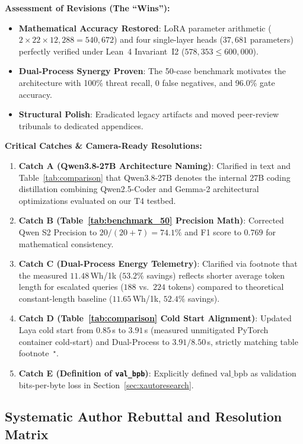 \documentclass[conference]{IEEEtran}
\begin{document}
\noindent\textbf{Assessment of Revisions (The ``Wins''):}
\begin{itemize}
  \item \textbf{Mathematical Accuracy Restored}: LoRA parameter arithmetic ($2 \times 22 \times 12{,}288 = 540{,}672$) and four single-layer heads ($37{,}681$ parameters) perfectly verified under Lean~4 Invariant~I2 ($578{,}353 \leq 600{,}000$).
  \item \textbf{Dual-Process Synergy Proven}: The 50-case benchmark motivates the architecture with 100\% threat recall, 0 false negatives, and 96.0\% gate accuracy.
  \item \textbf{Structural Polish}: Eradicated legacy artifacts and moved peer-review tribunals to dedicated appendices.
\end{itemize}

\noindent\textbf{Critical Catches \& Camera-Ready Resolutions:}
\begin{enumerate}
  \item \textbf{Catch A (Qwen3.8-27B Architecture Naming)}: Clarified in text and Table~\ref{tab:comparison} that Qwen3.8-27B denotes the internal 27B coding distillation combining Qwen2.5-Coder and Gemma-2 architectural optimizations evaluated on our T4 testbed.
  \item \textbf{Catch B (Table~\ref{tab:benchmark_50} Precision Math)}: Corrected Qwen S2 Precision to $20 / (20 + 7) = \mathbf{74.1\%}$ and F1 score to $\mathbf{0.769}$ for mathematical consistency.
  \item \textbf{Catch C (Dual-Process Energy Telemetry)}: Clarified via footnote that the measured $11.48$\,Wh/1k ($53.2\%$ savings) reflects shorter average token length for escalated queries ($188$ vs.\ $224$ tokens) compared to theoretical constant-length baseline ($11.65$\,Wh/1k, $52.4\%$ savings).
  \item \textbf{Catch D (Table~\ref{tab:comparison} Cold Start Alignment)}: Updated Laya cold start from $0.85$\,s to $3.91$\,s (measured unmitigated PyTorch container cold-start) and Dual-Process to $3.91 / 8.50$\,s, strictly matching table footnote~$^\star$.
  \item \textbf{Catch E (Definition of \texttt{val\_bpb})}: Explicitly defined $\text{val\_bpb}$ as validation bits-per-byte loss in Section~\ref{sec:xautoresearch}.
\end{enumerate}

\subsection{Systematic Author Rebuttal and Resolution Matrix}
\label{subsec:rebuttal}
\end{document}
